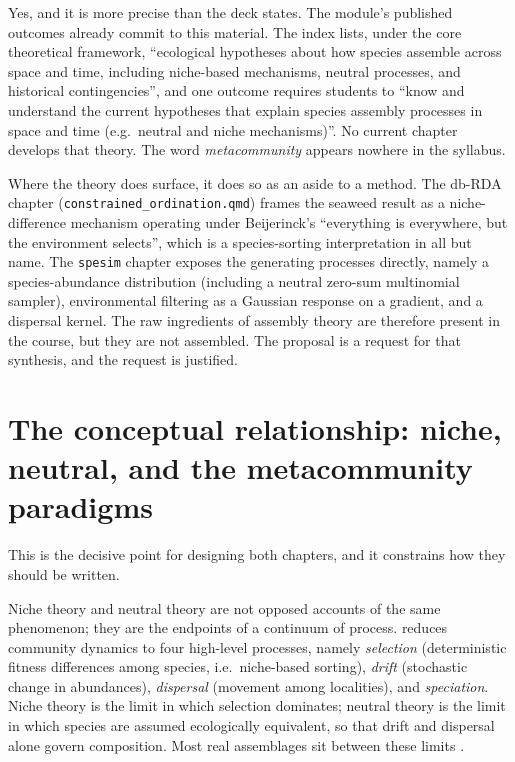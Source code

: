 \documentclass[11pt,a4paper]{article}
\newcommand{\fname}[1]{\texttt{\small #1}}
\begin{document}
Yes, and it is more precise than the deck states. The module's published outcomes already
commit to this material. The index lists, under the core theoretical framework,
``ecological hypotheses about how species assemble across space and time, including
niche-based mechanisms, neutral processes, and historical contingencies'', and one
outcome requires students to ``know and understand the current hypotheses that explain
species assembly processes in space and time (e.g.\ neutral and niche mechanisms)''. No
current chapter develops that theory. The word \emph{metacommunity} appears nowhere in
the syllabus.

Where the theory does surface, it does so as an aside to a method. The db-RDA chapter
(\fname{constrained\_ordination.qmd}) frames the seaweed result as a niche-difference
mechanism operating under Beijerinck's ``everything is everywhere, but the environment
selects'', which is a species-sorting interpretation in all but name. The \fname{spesim}
chapter exposes the generating processes directly, namely a species-abundance
distribution (including a neutral zero-sum multinomial sampler), environmental filtering
as a Gaussian response on a gradient, and a dispersal kernel. The raw ingredients of
assembly theory are therefore present in the course, but they are not assembled. The
proposal is a request for that synthesis, and the request is justified.

\section{The conceptual relationship: niche, neutral, and the metacommunity paradigms}

This is the decisive point for designing both chapters, and it constrains how they should
be written.

Niche theory and neutral theory are not opposed accounts of the same phenomenon; they are
the endpoints of a continuum of process. \citet{vellend2010,vellend2016} reduces
community dynamics to four high-level processes, namely \emph{selection} (deterministic
fitness differences among species, i.e.\ niche-based sorting), \emph{drift} (stochastic
change in abundances), \emph{dispersal} (movement among localities), and
\emph{speciation}. Niche theory is the limit in which selection dominates; neutral theory
\citep{hubbell2001} is the limit in which species are assumed ecologically equivalent, so
that drift and dispersal alone govern composition. Most real assemblages sit between
these limits \citep{gravel2006,chase2011}.
\end{document}
